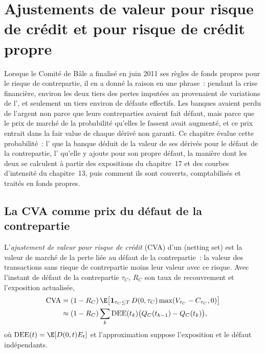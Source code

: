 \chapter{Ajustements de valeur pour risque de crédit et pour risque de crédit propre}\label{ch:rc:credit-and-debit-valuation-adjustments}

Lorsque le Comité de Bâle a finalisé en juin 2011 ses règles de fonds propres pour le risque de contrepartie,
il en a donné la raison en une phrase~: pendant la crise financière, environ les deux tiers des
pertes imputées au  provenaient de variations de l', et seulement un tiers environ de défauts effectifs. Les banques avaient perdu de l'argent
non parce que leurs contreparties avaient fait défaut, mais parce que le prix de marché de la probabilité qu'elles
le fassent avait augmenté, et ce prix entrait dans la fair value de chaque dérivé non garanti.
Ce chapitre évalue cette probabilité~: l' que la banque déduit de la
valeur de ses dérivés pour le défaut de la contrepartie, l'
qu'elle y ajoute pour son propre défaut, la manière dont les deux se calculent à partir des expositions du chapitre~17 et des
courbes d'intensité du chapitre~13, puis comment ils sont couverts, comptabilisés et traités en fonds propres.

\section{La CVA comme prix du défaut de la contrepartie}

\begin{definition}\label{def:rc:credit-and-debit-valuation-adjustments:cva}
L'\emph{ajustement de valeur pour risque de crédit} (CVA) d'un  (netting set) est la valeur de marché de la perte liée au défaut de la contrepartie~: la valeur des transactions
sans risque de contrepartie moins leur valeur avec ce risque. Avec l'instant de défaut de la contrepartie $\tau_C$,
$R_C$ son taux de recouvrement et l'exposition actualisée,
\begin{align*}
\mathrm{CVA} &= (1-R_C)\,\E\bigl[\mathbf 1_{\tau_C\le T}\,D(0,\tau_C)\max(V_{\tau_C}-C_{\tau_C},0)\bigr]\\
&\approx (1-R_C)\sum_k\mathrm{DEE}(t_k)\bigl(Q_C(t_{k-1})-Q_C(t_k)\bigr),
\end{align*}
où $\mathrm{DEE}(t) = \E[D(0,t)E_t]$ et l'approximation suppose l'exposition et le
défaut indépendants.
\end{definition}

